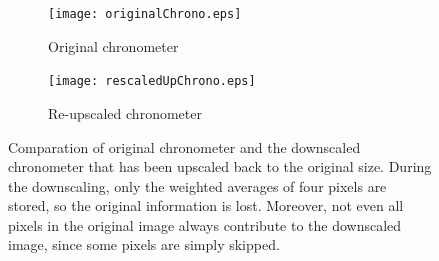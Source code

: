 \begin{figure}[!Hbt]
\centering
 \begin{subfigure}[b]{0.45\textwidth}
  \texttt{[image: originalChrono.eps]}
  \caption{Original chronometer}
  \label{fig:chrono_original1}
 \end{subfigure}
 \begin{subfigure}[b]{0.45\textwidth}
  \texttt{[image: rescaledUpChrono.eps]}
  \caption{Re-upscaled chronometer}
  \label{fig:chrono_down_up}
 \end{subfigure}
 \caption{Comparation of original chronometer and the downscaled chronometer that has been upscaled back to the original size. During the downscaling, only the weighted averages of four pixels are stored, so the original information is lost. Moreover, not even all pixels in the original image always contribute to the downscaled image, since some pixels are simply skipped.}
 \label{fig:chrono_compare}
\end{figure}

\clearpage